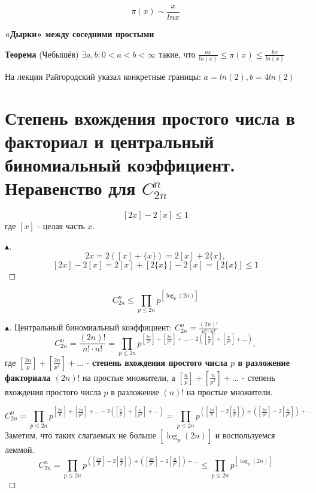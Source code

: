 $$\pi(x) \sim \frac{x}{ln x}$$

\textbf{«Дырки» между соседними простыми}

\textbf{Теорема} (Чебышёв) $\exists a, b : 0 < a < b < \infty$ такие, что $\frac{ax}{ln(x)} \leq \pi(x) \leq \frac{bx}{ln(x)}$

На лекции Райгородский указал конкретные границы: $a = ln(2), b = 4 ln(2)$


\section{Степень вхождения простого числа в факториал и центральный биномиальный коэффициент. Неравенство для $C_{2n}^{n}$}
\begin{lemma}
    $$[2x] - 2[x] \leq 1$$
    где $[x]$ - целая часть $x$.
    \begin{proof}[$\blacktriangle$]
        $$2x = 2([x] + \{x\}) = 2[x] + 2\{x\}, $$
        $$[2x] - 2[x] = 2[x] + [2\{x\}] - 2[x] = [2\{x\}]  \leq 1$$
    \end{proof}
\end{lemma}
\begin{theorem}
    $$C_{2n}^n \leq \prod\limits_{p \leq 2n} p ^ {[\log_{p} (2n)]}$$
    \begin{proof}[$\blacktriangle$]
        Центральный биномиальный коэффициент: $C_{2n}^{n} = \frac{(2n)!}{n! \cdot n!}$
        $$C_{2n}^{n} = \frac{(2n)!}{n! \cdot n!} = \prod\limits_{p \leq 2n} p^{\left[ \frac{2n}{p} \right] + \left[ \frac{2n}{p^2} \right] + ... - 2 \left( \left[ \frac{n}{p} \right] + \left[ \frac{n}{p^2} \right] + ... \right) },$$
        где $\left[ \frac{2n}{p} \right] + \left[ \frac{2n}{p^2} \right] + ...$ - \textbf{степень вхождения простого числа $p$ в разложение факториала $(2n)!$} на простые множители, а $ \left[ \frac{n}{p} \right] + \left[ \frac{n}{p^2} \right] + ... $ - степень вхождения простого числа $p$ в разложение $(n)!$ на простые множители.
        
        $$C_{2n}^{n} = \prod\limits_{p \leq 2n} p^{\left[ \frac{2n}{p} \right] + \left[ \frac{2n}{p^2} \right] + ... - 2 \left( \left[ \frac{n}{p} \right] + \left[ \frac{n}{p^2} \right] + ... \right) } = \prod\limits_{p \leq 2n} p^{\left( \left[ \frac{2n}{p} \right] - 2 \left[ \frac{n}{p} \right] \right) + \left( \left[ \frac{2n}{p^2} \right] - 2 \left[ \frac{n}{p^2} \right] \right) + ...}$$
        Заметим, что таких слагаемых не больше $[\log_{p} (2n)]$ и воспользуемся леммой.
        $$C_{2n}^{n} = \prod\limits_{p \leq 2n} p^{\left( \left[ \frac{2n}{p} \right] - 2 \left[ \frac{n}{p} \right] \right) + \left( \left[ \frac{2n}{p^2} \right] - 2 \left[ \frac{n}{p^2} \right] \right) + ...} \leq \prod \limits_{p \leq 2n} p ^ { \left[ \log_{p} (2n) \right] }$$
    \end{proof}
\end{theorem}


